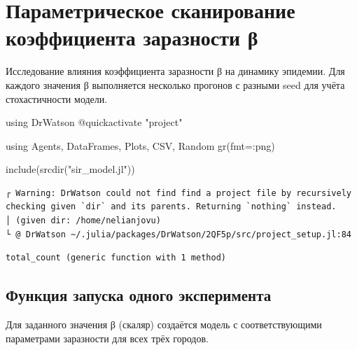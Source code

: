 \documentclass[
  12pt,
  a4paper,
  DIV=11,
  numbers=noendperiod]{scrreprt}
\newenvironment{Shaded}{\begin{snugshade}}{\end{snugshade}}
\newcommand{\BuiltInTok}[1]{\textcolor[rgb]{0.00,0.23,0.31}{#1}}
\newcommand{\FunctionTok}[1]{\textcolor[rgb]{0.28,0.35,0.67}{#1}}
\newcommand{\ImportTok}[1]{\textcolor[rgb]{0.00,0.46,0.62}{#1}}
\newcommand{\NormalTok}[1]{\textcolor[rgb]{0.00,0.23,0.31}{#1}}
\newcommand{\OperatorTok}[1]{\textcolor[rgb]{0.37,0.37,0.37}{#1}}
\newcommand{\PreprocessorTok}[1]{\textcolor[rgb]{0.68,0.00,0.00}{#1}}
\newcommand{\StringTok}[1]{\textcolor[rgb]{0.13,0.47,0.30}{#1}}
\begin{document}
\chapter{Параметрическое сканирование коэффициента заразности
β}\label{ux43fux430ux440ux430ux43cux435ux442ux440ux438ux447ux435ux441ux43aux43eux435-ux441ux43aux430ux43dux438ux440ux43eux432ux430ux43dux438ux435-ux43aux43eux44dux444ux444ux438ux446ux438ux435ux43dux442ux430-ux437ux430ux440ux430ux437ux43dux43eux441ux442ux438-ux3b2-1}

Исследование влияния коэффициента заразности β на динамику эпидемии. Для
каждого значения β выполняется несколько прогонов с разными seed для
учёта стохастичности модели.

\begin{Shaded}
\begin{Highlighting}[]
\ImportTok{using} \BuiltInTok{DrWatson}
\PreprocessorTok{@quickactivate} \StringTok{"project"}

\ImportTok{using} \BuiltInTok{Agents}\NormalTok{, }\BuiltInTok{DataFrames}\NormalTok{, }\BuiltInTok{Plots}\NormalTok{, }\BuiltInTok{CSV}\NormalTok{, }\BuiltInTok{Random}
\FunctionTok{gr}\NormalTok{(fmt}\OperatorTok{=:}\NormalTok{png)}

\FunctionTok{include}\NormalTok{(}\FunctionTok{srcdir}\NormalTok{(}\StringTok{"sir\_model.jl"}\NormalTok{))}
\end{Highlighting}
\end{Shaded}

\begin{verbatim}
┌ Warning: DrWatson could not find find a project file by recursively checking given `dir` and its parents. Returning `nothing` instead.
│ (given dir: /home/nelianjovu)
└ @ DrWatson ~/.julia/packages/DrWatson/2QF5p/src/project_setup.jl:84
\end{verbatim}

\begin{verbatim}
total_count (generic function with 1 method)
\end{verbatim}

\section{Функция запуска одного
эксперимента}\label{ux444ux443ux43dux43aux446ux438ux44f-ux437ux430ux43fux443ux441ux43aux430-ux43eux434ux43dux43eux433ux43e-ux44dux43aux441ux43fux435ux440ux438ux43cux435ux43dux442ux430-1}

Для заданного значения β (скаляр) создаётся модель с соответствующими
параметрами заразности для всех трёх городов.
\end{document}
